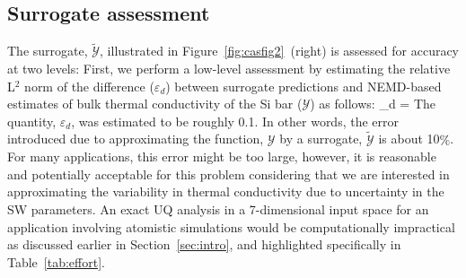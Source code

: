 \subsection{Surrogate assessment}
\label{sub:ver}

The surrogate, $\tilde{\mathcal{Y}}$, illustrated in Figure~\ref{fig:casfig2}~(right) 
is assessed for accuracy at two levels: First, we perform a low-level assessment by estimating
 the relative L$^2$ norm of the difference
($\varepsilon_d$) between surrogate predictions and NEMD-based estimates of bulk thermal conductivity 
of the Si bar ($\mathcal{Y}$) as follows:
%
\be
\varepsilon_d = 
\ee
%
The quantity, $\varepsilon_d$, was estimated to be roughly 0.1. In other words, the error introduced
due to approximating the function, $\mathcal{Y}$ by a surrogate, $\tilde{\mathcal{Y}}$ is about 10$\%$.
For many applications, this error might be too large, however, it is reasonable and
potentially acceptable for this problem considering that we are interested in approximating
the variability in thermal conductivity due to uncertainty in the SW
parameters. An exact UQ analysis in a 7-dimensional input space for an application involving
atomistic simulations would be computationally impractical as discussed earlier in
Section~\ref{sec:intro}, and highlighted specifically in Table~\ref{tab:effort}.

